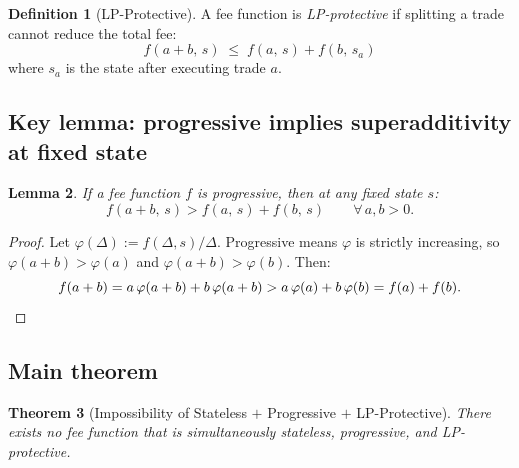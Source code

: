 \documentclass[11pt]{article}
\newtheorem{theorem}{Theorem}[section]
\newtheorem{lemma}[theorem]{Lemma}
\theoremstyle{definition}
\newtheorem{definition}[theorem]{Definition}
\theoremstyle{remark}
\begin{document}
\begin{definition}[LP-Protective]
A fee function is \emph{LP-protective} if splitting a trade cannot reduce the total fee:
\[
f(a+b,\,s) \;\le\; f(a,\,s) + f(b,\,s_a)
\]
where $s_a$ is the state after executing trade $a$.
\end{definition}

\subsection{Key lemma: progressive implies superadditivity at fixed state}

\begin{lemma}\label{lem:prog-super}
If a fee function $f$ is progressive, then at any fixed state $s$:
\[
f(a+b,\,s) > f(a,\,s) + f(b,\,s) \qquad\forall\, a,b>0.
\]
\end{lemma}

\begin{proof}
Let $\varphi(\Delta):=f(\Delta,s)/\Delta$. Progressive means $\varphi$ is strictly increasing, so $\varphi(a+b)>\varphi(a)$ and $\varphi(a+b)>\varphi(b)$. Then:
\[
f(a+b) = a\,\varphi(a+b) + b\,\varphi(a+b) > a\,\varphi(a) + b\,\varphi(b) = f(a)+f(b). \qedhere
\]
\end{proof}

\subsection{Main theorem}

\begin{theorem}[Impossibility of Stateless $+$ Progressive $+$ LP-Protective]\label{thm:impossibility}
There exists no fee function that is simultaneously stateless, progressive, and LP-protective.
\end{theorem}
\end{document}
